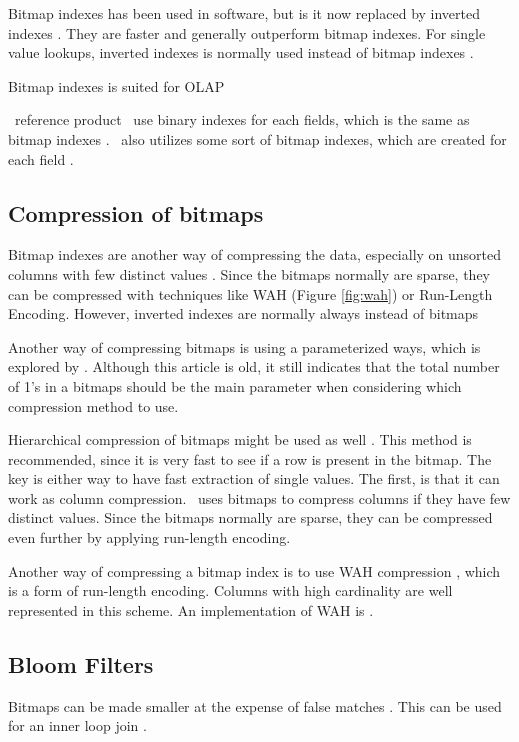 Bitmap indexes has been used in  software, but is it now replaced by inverted indexes \cite{Bjorklund2011-wh}. They are faster and generally outperform bitmap indexes. For single value lookups, inverted indexes is normally used instead of bitmap indexes \cite{Moffat1992-tz}.

Bitmap indexes is suited for OLAP \cite{Stonebraker2005-qz}

\genusSoftware~reference product \qlikview~use binary indexes for each fields, which is the same as bitmap indexes \cite{Qlik2011-ef}. \qlikview~also utilizes some sort of bitmap indexes, which are created for each field \cite{Qlik2011-ef}.

\subsection{Compression of bitmaps}
\label{sub:Compression of bitmaps}
Bitmap indexes are another way of compressing the data, especially on unsorted columns with few distinct values \cite{Stonebraker2005-qz}. Since the bitmaps normally are sparse, they can be compressed with techniques like WAH \cite{Bjorklund2011-wh} (Figure \ref{fig:wah}) or Run-Length Encoding. However, inverted indexes are normally always instead of bitmaps \cite{Witten1999-qq}

Another way of compressing bitmaps is using a parameterized ways, which is explored by \cite{Moffat1992-tz}. Although this article is old, it still indicates that the total number of 1's in a bitmaps should be the main parameter when considering which compression method to use.

Hierarchical compression of bitmaps might be used as well \cite{Witten1999-qq}. This method is recommended, since it is very fast to see if a row is present in the bitmap. The key is either way to have fast extraction of single values.
The first, is that it can work as column compression. \cstore~uses bitmaps to compress columns if they have few distinct values. Since the bitmaps normally are sparse, they can be compressed even further by applying run-length encoding.


Another way of compressing a bitmap index is to use WAH compression \cite{Bjorklund2011-wh}, which is a form of run-length encoding. Columns with high cardinality are well represented in this scheme. An implementation of WAH is .

\subsection{Bloom Filters}
\label{sub:Bloom Filters}
Bitmaps can be made smaller at the expense of false matches \cite{Witten1999-qq}. This can be used for an inner loop join .

